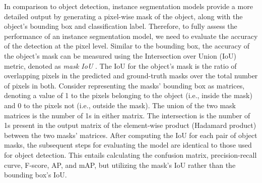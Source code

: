 In comparison to object detection, instance segmentation models provide a more detailed output by generating a pixel-wise mask of the object, along with the object's bounding box and classification label. Therefore, to fully assess the performance of an instance segmentation model, we need to evaluate the accuracy of the detection at the pixel level. Similar to the bounding box, the accuracy of the object's mask can be measured using the Intersection over Union (IoU) metric, denoted as \emph{mask IoU} \cite{instance_segementation_metric_2022, mask_rcnn_2017}. The IoU for the object's mask is the ratio of overlapping pixels in the predicted and ground-truth masks over the total number of pixels in both. Consider representing the masks' bounding box as matrices, denoting a value of 1 to the pixels belonging to the object (i.e., inside the mask) and 0 to the pixels not (i.e., outside the mask). The union of the two mask matrices is the number of 1s in either matrix. The intersection is the number of 1s present in the output matrix of the element-wise product (Hadamard product) between the two masks' matrices. After computing the IoU for each pair of object masks, the subsequent steps for evaluating the model are identical to those used for object detection. This entails calculating the confusion matrix, precision-recall curve, F-score, AP, and mAP, but utilizing the mask's IoU rather than the bounding box's IoU.